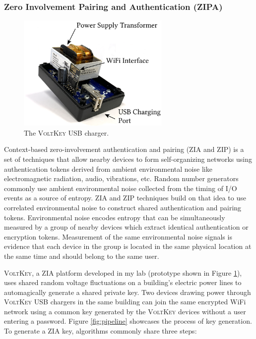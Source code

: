 \documentclass[10pt,onecolumn]{article}
\begin{document}
\subsubsection{Zero Involvement Pairing and Authentication (ZIPA)}

\begin{figure}
\centering
\includegraphics[width=2.9in]{figures/voltkey.png}
\caption{The \textsc{VoltKey} USB charger.}
\label{fig:voltkey}
\end{figure}

Context-based zero-involvement authentication and pairing (ZIA and ZIP) is a set of techniques that allow nearby devices to form self-organizing networks using authentication tokens derived from ambient environmental noise like electromagnetic radiation, audio, vibrations, etc.
Random number generators commonly use ambient environmental noise collected from the timing of I/O events as a source of entropy.
ZIA and ZIP techniques build on that idea to use correlated environmental noise to construct shared authentication and pairing tokens.
Environmental noise encodes entropy that can be simultaneously measured by a group of nearby devices which extract identical authentication or encryption tokens.
Measurement of the same environmental noise signals is evidence that each device in the group is located in the same physical location at the same time and should belong to the same user.


\textsc{VoltKey}, a ZIA platform developed in my lab (prototype shown in Figure \ref{fig:voltkey}), uses shared random voltage fluctuations on a building's electric power lines to automagically generate a shared private key.
Two devices drawing power through \textsc{VoltKey} USB chargers in the same building can join the same encrypted WiFi network using a common key generated by the \textsc{VoltKey} devices without a user entering a password.
Figure \ref{fig:pipeline} showcases the process of key generation.
To generate a ZIA key, algorithms commonly share three steps:
\end{document}
